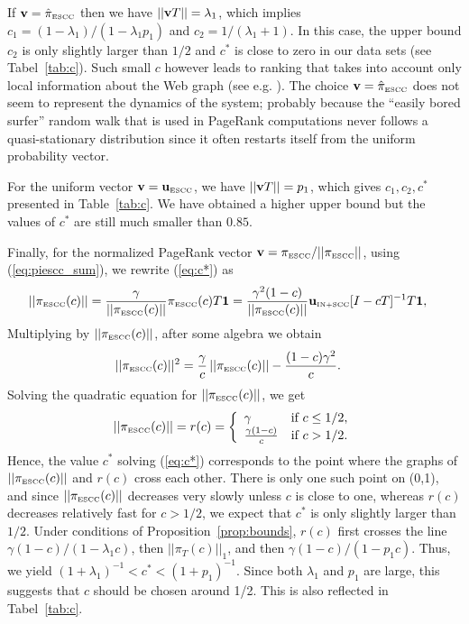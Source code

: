 \documentclass{article}
\newcommand{\escc}{{\mbox{\tiny ESCC}}}
\newcommand{\onesccn}{{\bf 1}}
\def\u{{{\bf u}_{\mbox{\tiny IN+SCC}}}}
\def\v{{\bf v}}
\def\ue{{{\bf u}_{\mbox{\tiny ESCC}}}}
\begin{document}
If $\v=\hat{\pi}_\escc$ then we have $||\v T||=\lambda_1$, which
implies $c_1=(1-\lambda_1)/(1-\lambda_1p_1)$ and
$c_2=1/(\lambda_1+1)$. In this case, the upper bound $c_2$ is only
slightly larger than $1/2$ and $c^*$ is close to zero in our data
sets (see Tabel~\ref{tab:c}). Such small $c$ however leads to
ranking that takes into account only local information about the Web
graph (see e.g. \cite{Fortunato06gn}). The choice
$\v=\hat{\pi}_\escc$ does not seem to represent the dynamics of the
system; probably because the ``easily bored surfer'' random walk
that is used in PageRank computations never follows a
quasi-stationary distribution since it often restarts itself from
the uniform probability vector.

For the uniform vector $\v=\ue$, we have $||\v T||=p_1$, which
gives $c_1,c_2,c^*$ presented in Table~\ref{tab:c}. We have obtained a higher upper bound but the
values of $c^*$ are still much smaller than $0.85$.

Finally, for the normalized PageRank vector
$\v=\pi_\escc/||\pi_\escc||$, using (\ref{eq:piescc_sum}), we
rewrite (\ref{eq:c*}) as
\begin{align*}
||\pi_\escc(c)||&=
\frac{\gamma}{||\pi_\escc(c)||}\pi_\escc(c)T\onesccn=
\frac{\gamma^2(1-c)}{||\pi_\escc(c)||}{\u}[I-cT]^{-1}T\onesccn,
\end{align*}
Multiplying by $||\pi_\escc(c)||$, after some algebra we obtain
\begin{eqnarray*}
||\pi_\escc(c)||^2&=
\frac{\gamma}{c}\,||\pi_\escc(c)||-\frac{(1-c)\gamma^2}{c}.
\end{eqnarray*}
Solving the quadratic equation for $||\pi_\escc(c)||$, we get
\[||\pi_\escc(c)||=r(c)=\left\{\begin{array}{ll}\gamma&\mbox{if }c\le 1/2,\\
\frac{\gamma(1-c)}{c}&\mbox{if }c>1/2.\end{array}\right.\] Hence,
the value $c^*$ solving (\ref{eq:c*}) corresponds to the point
where the graphs of $||\pi_\escc(c)||$ and $r(c)$ cross each
other. There is only one such point on (0,1), and since
$||\pi_\escc(c)||$ decreases very slowly unless $c$ is close to
one, whereas $r(c)$ decreases relatively fast for $c>1/2$, we
expect that $c^*$ is only slightly larger than $1/2$. Under
conditions of Proposition~\ref{prop:bounds}, $r(c)$ first crosses
the line $\gamma(1-c)/(1-\lambda_1c)$, then $||\pi_{T}(c)||_1$,
and then $\gamma(1-c)/(1-p_1c)$. Thus, we yield
$(1+\lambda_1)^{-1}<c^*< (1+p_1)^{-1}$. Since both $\lambda_1$ and
$p_1$ are large, this suggests that $c$ should be chosen
around 1/2. This is also reflected in Tabel~\ref{tab:c}.
\end{document}
